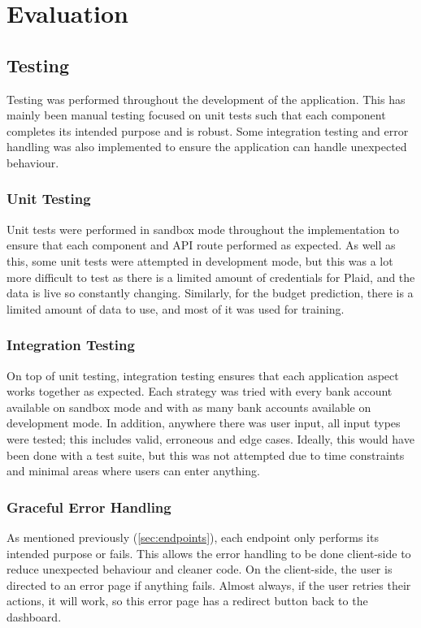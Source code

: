 \chapter{Evaluation}
\label{ch:evaluation}

\section{Testing}
Testing was performed throughout the development of the application. This has mainly been manual testing focused on unit tests such that each component completes its intended purpose and is robust. Some integration testing and error handling was also implemented to ensure the application can handle unexpected behaviour.

\subsection{Unit Testing}
Unit tests were performed in sandbox mode throughout the implementation to ensure that each component and API route performed as expected. As well as this, some unit tests were attempted in development mode, but this was a lot more difficult to test as there is a limited amount of credentials for Plaid, and the data is live so constantly changing. Similarly, for the budget prediction, there is a limited amount of data to use, and most of it was used for training.

\subsection{Integration Testing}
On top of unit testing, integration testing ensures that each application aspect works together as expected. Each strategy was tried with every bank account available on sandbox mode and with as many bank accounts available on development mode. In addition, anywhere there was user input, all input types were tested; this includes valid, erroneous and edge cases. Ideally, this would have been done with a test suite, but this was not attempted due to time constraints and minimal areas where users can enter anything.


\subsection{Graceful Error Handling}
As mentioned previously (\ref{sec:endpoints}), each endpoint only performs its intended purpose or fails. This allows the error handling to be done client-side to reduce unexpected behaviour and cleaner code. On the client-side, the user is directed to an error page if anything fails. Almost always, if the user retries their actions, it will work, so this error page has a redirect button back to the dashboard.


